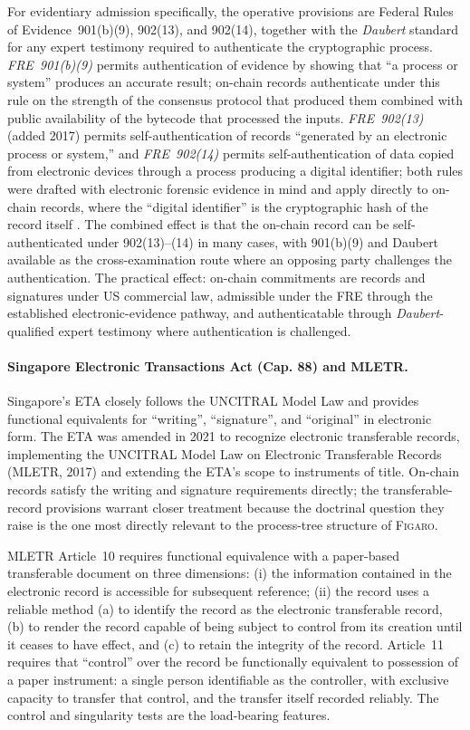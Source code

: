 \documentclass[11pt,a4paper]{article}
\theoremstyle{remark}
\newcommand{\figaro}{\textsc{Figaro}}
\begin{document}
For evidentiary admission specifically, the operative provisions
are Federal Rules of Evidence~901(b)(9), 902(13), and 902(14),
together with the \emph{Daubert} standard for any expert
testimony required to authenticate the cryptographic process.
\emph{FRE~901(b)(9)} permits authentication of evidence by
showing that ``a process or system'' produces an accurate
result; on-chain records authenticate under this rule on the
strength of the consensus protocol that produced them combined
with public availability of the bytecode that processed the
inputs. \emph{FRE~902(13)} (added 2017) permits self-authentication
of records ``generated by an electronic process or system,'' and
\emph{FRE~902(14)} permits self-authentication of data copied
from electronic devices through a process producing a digital
identifier; both rules were drafted with electronic forensic
evidence in mind and apply directly to on-chain records, where
the ``digital identifier'' is the cryptographic hash of the
record itself \citep{frelegislative2017}. The combined effect
is that the on-chain record can be self-authenticated under
902(13)--(14) in many cases, with 901(b)(9) and Daubert
available as the cross-examination route where an opposing
party challenges the authentication. The practical effect: on-chain
commitments are records and signatures under US commercial law,
admissible under the FRE through the established
electronic-evidence pathway, and authenticatable through
\emph{Daubert}-qualified expert testimony where authentication
is challenged.

\paragraph{Singapore Electronic Transactions Act (Cap. 88) and MLETR.}
Singapore's ETA closely follows the UNCITRAL Model Law and
provides functional equivalents for ``writing'',
``signature'', and ``original'' in electronic form. The ETA was
amended in 2021 to recognize electronic transferable records,
implementing the UNCITRAL Model Law on Electronic Transferable
Records (MLETR, 2017) and extending the ETA's scope to
instruments of title. On-chain records satisfy the writing and
signature requirements directly; the transferable-record
provisions warrant closer treatment because the doctrinal
question they raise is the one most directly relevant to the
process-tree structure of \figaro{}.

MLETR Article~10 requires functional equivalence with a paper-based
transferable document on three dimensions: (i) the information
contained in the electronic record is accessible for subsequent
reference; (ii) the record uses a reliable method (a) to identify
the record as the electronic transferable record, (b) to render
the record capable of being subject to control from its creation
until it ceases to have effect, and (c) to retain the integrity
of the record. Article~11 requires that ``control'' over the
record be functionally equivalent to possession of a paper
instrument: a single person identifiable as the controller, with
exclusive capacity to transfer that control, and the transfer
itself recorded reliably. The control and singularity tests are
the load-bearing features.
\end{document}
